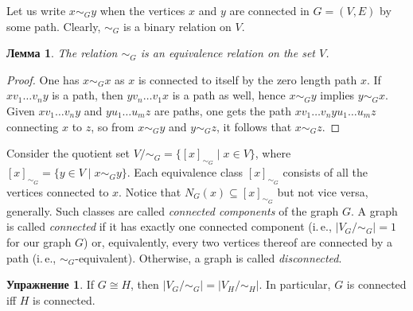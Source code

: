 \documentclass[12pt,notitlepage]{article}
\theoremstyle{plain}
\newtheorem{lemma}[thm]{Лемма}
\theoremstyle{definition}
\newtheorem{exc}[thm]{Упражнение}
\theoremstyle{plain}
\newcommand{\sbs}{\subseteq}
\newcommand{\1}{\mathbf{1}}
\newcommand{\0}{\mathbf{0}}
\begin{document}
Let us write $x \sim_G y$ when the vertices $x$ and $y$ are connected in $G = (V, E)$ by some path. Clearly, ${\sim_G}$ is a binary relation on $V$.

\begin{lemma}
	The relation ${\sim_G}$ is an equivalence relation on the set $V$.
\end{lemma}
\begin{proof}
	One has $x \sim_G x$ as $x$ is connected to itself by the zero length path $x$. If $x v_1 \ldots v_n y$ is a path, then $y v_n \ldots v_1 x$ is a path as well, hence $x \sim_G y$ implies $y \sim_G x$. Given $x v_1 \ldots v_n y$ and $y u_1 \ldots u_m z$ are paths, one gets the path $x v_1 \ldots v_n y u_1 \ldots u_m z$ connecting $x$ to $z$, so from $x \sim_G y$ and $y \sim_G z$, it follows that $x \sim_G z$.
\end{proof}

Consider the quotient set $V / {\sim_G} = \{ [x]_{\sim_G} \mid x \in V \}$, where $[x]_{\sim_G} = \{ y \in V \mid x \sim_G y \}$. Each equivalence class $[x]_{\sim_G}$ consists of all the vertices connected to $x$. Notice that $N_G(x) \sbs [x]_{\sim_G}$ but not vice versa, generally. Such classes are called \emph{connected components} of the graph $G$. A graph is called \emph{connected} if it has exactly one connected component (i.\,e., $|V_G / {\sim_G}| = 1$ for our graph $G$) or, equivalently, every two vertices thereof are connected by a path (i.\,e., ${\sim_G}$-equivalent). Otherwise, a graph is called \emph{disconnected}.

\begin{exc}
	If $G \cong H$, then $|V_G / {\sim_G}| = |V_H / {\sim_H}|$. In particular, $G$ is connected iff $H$ is connected.
\end{exc}
\end{document}

